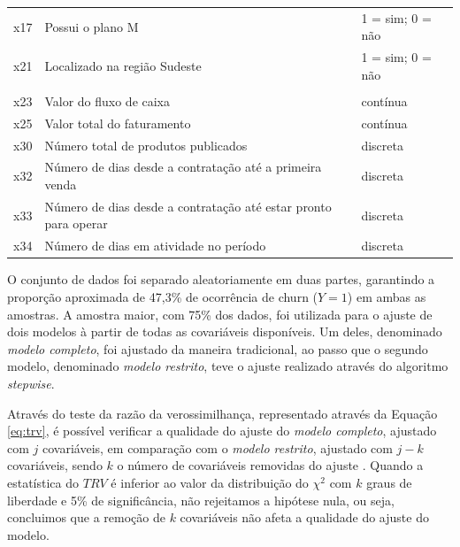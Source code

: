 \documentclass[twocolumn]{rbef}
\newcommand{\1}{\mathbbm{1}}
\begin{document}
\begin{table}
\begin{tabular}[t]{lll}
\hspace{1em}x17 & Possui o plano M & 1 = sim; 0 = não\\
\hspace{1em}x21 & Localizado na região Sudeste & 1 = sim; 0 = não\\
\addlinespace[0.3em]
\multicolumn{3}{l}{\textbf{Quantitativas}}\\
\hspace{1em}x23 & Valor do fluxo de caixa & contínua\\
\hspace{1em}x25 & Valor total do faturamento & contínua\\
\hspace{1em}x30 & Número total de produtos publicados & discreta\\
\hspace{1em}x32 & Número de dias desde a contratação até a primeira venda & discreta\\
\hspace{1em}x33 & Número de dias desde a contratação até estar pronto para operar & discreta\\
\hspace{1em}x34 & Número de dias em atividade no período & discreta\\
\bottomrule
\end{tabular}
\end{table}

O conjunto de dados foi separado aleatoriamente em duas partes, garantindo a proporção aproximada de 47,3\% de ocorrência de churn (\(Y=1\)) em ambas as amostras. A amostra maior, com 75\% dos dados, foi utilizada para o ajuste de dois modelos à partir de todas as covariáveis disponíveis. Um deles, denominado \textit{modelo completo}, foi ajustado da maneira tradicional, ao passo que o segundo modelo, denominado \textit{modelo restrito}, teve o ajuste realizado através do algoritmo \textit{stepwise}.

Através do teste da razão da verossimilhança, representado através da Equação \eqref{eq:trv}, é possível verificar a qualidade do ajuste do \textit{modelo completo}, ajustado com \(j\) covariáveis, em comparação com o \textit{modelo restrito}, ajustado com \(j-k\) covariáveis, sendo \(k\) o número de covariáveis removidas do ajuste \cite{Favero2017}. Quando a estatística do \(TRV\) é inferior ao valor da distribuição do \({\chi}^2\) com \(k\) graus de liberdade e 5\% de significância, não rejeitamos a hipótese nula, ou seja, concluimos que a remoção de \(k\) covariáveis não afeta a qualidade do ajuste do modelo.
\end{document}
